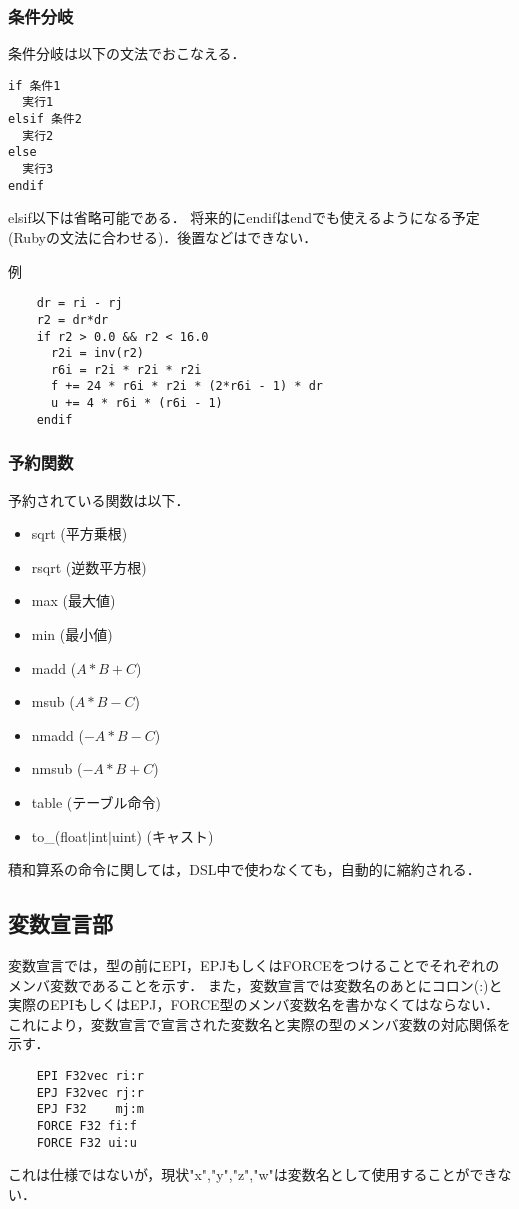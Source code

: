 \documentclass{article}
\begin{document}
 \subsubsection{条件分岐}
 条件分岐は以下の文法でおこなえる．
\begin{verbatim}
if 条件1 
  実行1
elsif 条件2
  実行2
else
  実行3
endif
\end{verbatim}
elsif以下は省略可能である．
将来的にendifはendでも使えるようになる予定(Rubyの文法に合わせる)．後置などはできない．

例
\begin{verbatim}
	dr = ri - rj
	r2 = dr*dr
	if r2 > 0.0 && r2 < 16.0
	  r2i = inv(r2)
	  r6i = r2i * r2i * r2i
	  f += 24 * r6i * r2i * (2*r6i - 1) * dr
	  u += 4 * r6i * (r6i - 1)
	endif
\end{verbatim}

 \subsubsection{予約関数}
 予約されている関数は以下．
  \begin{itemize}
   \item sqrt (平方乗根)
   \item rsqrt (逆数平方根)
   \item max (最大値)
   \item min (最小値)
   \item madd ($A*B + C$)
   \item msub ($A*B - C$)
   \item nmadd ($-A*B - C$)
   \item nmsub ($-A*B + C$)
   \item table (テーブル命令)
   \item to\_(float$|$int$|$uint) (キャスト)
  \end{itemize}
  積和算系の命令に関しては，DSL中で使わなくても，自動的に縮約される．

\subsection{変数宣言部}
変数宣言では，型の前にEPI，EPJもしくはFORCEをつけることでそれぞれのメンバ変数であることを示す．
また，変数宣言では変数名のあとにコロン(:)と実際のEPIもしくはEPJ，FORCE型のメンバ変数名を書かなくてはならない．
これにより，変数宣言で宣言された変数名と実際の型のメンバ変数の対応関係を示す．
\begin{verbatim}
	EPI F32vec ri:r
	EPJ F32vec rj:r
	EPJ F32    mj:m
	FORCE F32 fi:f
	FORCE F32 ui:u
\end{verbatim}
これは仕様ではないが，現状"x","y","z","w"は変数名として使用することができない．
\end{document}
